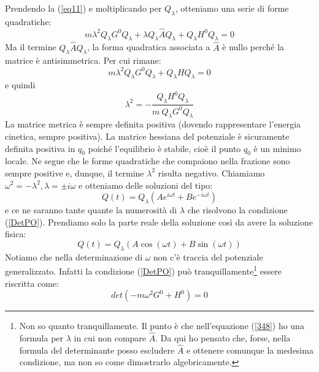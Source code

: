 \documentclass[a4paper,openany]{article}
\begin{document}
	Prendendo la (\ref{eq11}) e moltiplicando per $Q_{\lambda}$, otteniamo una serie di forme quadratiche:
	$$
	m\lambda^{2}Q_{\lambda}G^{0}Q_{\lambda} + \lambda Q_{\lambda}\hat{A}Q_{\lambda} + Q_{\lambda}H^{0}Q_{\lambda} = 0
	$$
	Ma il termine $Q_{\lambda}\hat{A}Q_{\lambda}$, la forma quadratica associata a $\hat{A}$ è nullo perché la matrice è antisimmetrica. Per cui rimane:
	$$
	m\lambda^{2}Q_{\lambda}G^{0}Q_{\lambda} + Q_{\lambda}HQ_{\lambda} = 0
	$$
	e quindi
	\begin{equation}
		\lambda^{2} = -\dfrac{Q_{\lambda}H^{0}Q_{\lambda}}{m \> Q_{\lambda}G^{0}Q_{\lambda}}
		\label{348}
	\end{equation}
	La matrice metrica è sempre definita positiva (dovendo rappresentare l'energia cinetica, sempre positiva). La matrice hessiana del potenziale è sicuramente definita positiva in $q_0$ poiché l'equilibrio è stabile, cioè il punto $q_0$ è un minimo locale. Ne segue che le forme quadratiche che compaiono nella frazione sono sempre positive e, dunque, il termine $\lambda^{2}$ risulta negativo. Chiamiamo $\omega^{2}=-\lambda^{2}, \lambda = \pm i \omega$ e otteniamo delle soluzioni del tipo:
	\begin{equation}\label{key}
		Q(t) = Q_{\lambda} (Ae^{i\omega t}+Be^{-i\omega t})
	\end{equation}
	e ce ne saranno tante quante la numerosità di $\lambda$ che risolvono la condizione (\ref{DetPO}). Prendiamo solo la parte reale della soluzione così da avere la soluzione fisica:
	\begin{equation}\label{key}
		Q(t) = Q_{\lambda} (A\cos(\omega t)+B\sin(\omega t))
	\end{equation}
	Notiamo che nella determinazione di $\omega$ non c'è traccia del potenziale generalizzato. Infatti la condizione (\ref{DetPO}) può tranquillamente\footnote{Non so quanto tranquillamente. Il punto è che nell'equazione (\ref{348}) ho una formula per $\lambda$ in cui non compare $\hat{A}$. Da qui ho pensato che, forse, nella formula del determinante posso escludere $\hat{A}$ e ottenere comunque la medesima condizione, ma non so come dimostrarlo algebricamente. } essere riscritta come:
	\begin{equation}
		det(-m\omega^{2}G^{0} + H^{0}) = 0
		\label{DetPO}
	\end{equation}
	
	
	
\end{document}

